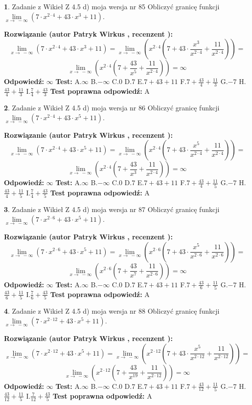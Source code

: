 \documentclass[12pt, a4paper]{article}
\theoremstyle{definition} %
\newtheorem{zad}{}
\newcommand{\zadStart}[1]{\begin{zad}#1\newline}
\newcommand{\zadStop}{\end{zad}}
\newcommand{\rozwStart}[2]{\noindent \textbf{Rozwiązanie (autor #1 , recenzent #2): }\newline}
\newcommand{\rozwStop}{\newline}
\newcommand{\odpStart}{\noindent \textbf{Odpowiedź:}\newline}
\newcommand{\odpStop}{\newline}
\newcommand{\testStart}{\noindent \textbf{Test:}\newline}
\newcommand{\testStop}{\newline}
\newcommand{\kluczStart}{\noindent \textbf{Test poprawna odpowiedź:}\newline}
\newcommand{\kluczStop}{\newline}
\begin{document}
\zadStart{Zadanie z Wikieł Z 4.5 d) moja wersja nr 85}
Obliczyć granicę funkcji  $\lim\limits_{x\to\ -\infty}(7 \cdot x^{2\cdot4}+43 \cdot x^{3}+11)$.
\zadStop
\rozwStart{Patryk Wirkus}{}
$$\lim\limits_{x\to\ -\infty}(7 \cdot x^{2\cdot4}+43 \cdot x^{3}+11) = \lim\limits_{x\to\ -\infty}(x^{2\cdot4}(7 +43 \cdot \frac{x^{3}}{x^{2\cdot4}}+\frac{11}{x^{2\cdot4}})) =$$ $$\lim\limits_{x\to\ -\infty}(x^{2\cdot4}(7 +\frac{43}{x^{5}}+\frac{11}{x^{2\cdot4}})) =\infty$$
\rozwStop
\odpStart
$\infty$
\odpStop
\testStart
A.$\infty$ B.$-\infty$ C.$0$ D.$7$ E.$7 + 43 + 11$
F.$7+\frac{43}{4}+\frac{11}{3}$ G.$-7$
H.$\frac{43}{4}+\frac{11}{3}$
I.$\frac{7}{4}+\frac{43}{3}$
\testStop
\kluczStart
A
\kluczStop



\zadStart{Zadanie z Wikieł Z 4.5 d) moja wersja nr 86}
Obliczyć granicę funkcji  $\lim\limits_{x\to\ -\infty}(7 \cdot x^{2\cdot4}+43 \cdot x^{5}+11)$.
\zadStop
\rozwStart{Patryk Wirkus}{}
$$\lim\limits_{x\to\ -\infty}(7 \cdot x^{2\cdot4}+43 \cdot x^{5}+11) = \lim\limits_{x\to\ -\infty}(x^{2\cdot4}(7 +43 \cdot \frac{x^{5}}{x^{2\cdot4}}+\frac{11}{x^{2\cdot4}})) =$$ $$\lim\limits_{x\to\ -\infty}(x^{2\cdot4}(7 +\frac{43}{x^{3}}+\frac{11}{x^{2\cdot4}})) =\infty$$
\rozwStop
\odpStart
$\infty$
\odpStop
\testStart
A.$\infty$ B.$-\infty$ C.$0$ D.$7$ E.$7 + 43 + 11$
F.$7+\frac{43}{4}+\frac{11}{5}$ G.$-7$
H.$\frac{43}{4}+\frac{11}{5}$
I.$\frac{7}{4}+\frac{43}{5}$
\testStop
\kluczStart
A
\kluczStop



\zadStart{Zadanie z Wikieł Z 4.5 d) moja wersja nr 87}
Obliczyć granicę funkcji  $\lim\limits_{x\to\ -\infty}(7 \cdot x^{2\cdot6}+43 \cdot x^{5}+11)$.
\zadStop
\rozwStart{Patryk Wirkus}{}
$$\lim\limits_{x\to\ -\infty}(7 \cdot x^{2\cdot6}+43 \cdot x^{5}+11) = \lim\limits_{x\to\ -\infty}(x^{2\cdot6}(7 +43 \cdot \frac{x^{5}}{x^{2\cdot6}}+\frac{11}{x^{2\cdot6}})) =$$ $$\lim\limits_{x\to\ -\infty}(x^{2\cdot6}(7 +\frac{43}{x^{7}}+\frac{11}{x^{2\cdot6}})) =\infty$$
\rozwStop
\odpStart
$\infty$
\odpStop
\testStart
A.$\infty$ B.$-\infty$ C.$0$ D.$7$ E.$7 + 43 + 11$
F.$7+\frac{43}{6}+\frac{11}{5}$ G.$-7$
H.$\frac{43}{6}+\frac{11}{5}$
I.$\frac{7}{6}+\frac{43}{5}$
\testStop
\kluczStart
A
\kluczStop



\zadStart{Zadanie z Wikieł Z 4.5 d) moja wersja nr 88}
Obliczyć granicę funkcji  $\lim\limits_{x\to\ -\infty}(7 \cdot x^{2\cdot12}+43 \cdot x^{5}+11)$.
\zadStop
\rozwStart{Patryk Wirkus}{}
$$\lim\limits_{x\to\ -\infty}(7 \cdot x^{2\cdot12}+43 \cdot x^{5}+11) = \lim\limits_{x\to\ -\infty}(x^{2\cdot12}(7 +43 \cdot \frac{x^{5}}{x^{2\cdot12}}+\frac{11}{x^{2\cdot12}})) =$$ $$\lim\limits_{x\to\ -\infty}(x^{2\cdot12}(7 +\frac{43}{x^{19}}+\frac{11}{x^{2\cdot12}})) =\infty$$
\rozwStop
\odpStart
$\infty$
\odpStop
\testStart
A.$\infty$ B.$-\infty$ C.$0$ D.$7$ E.$7 + 43 + 11$
F.$7+\frac{43}{12}+\frac{11}{5}$ G.$-7$
H.$\frac{43}{12}+\frac{11}{5}$
I.$\frac{7}{12}+\frac{43}{5}$
\testStop
\kluczStart
A
\kluczStop
\end{document}

